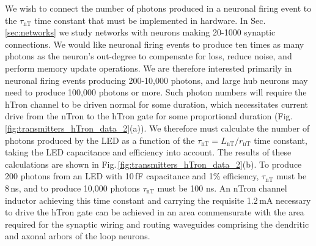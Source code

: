 \documentclass[twocolumn]{article}
\begin{document}
We wish to connect the number of photons produced in a neuronal firing event to the $\tau_{\mathrm{nT}}$ time constant that must be implemented in hardware. In Sec.\,\ref{sec:networks} we study networks with neurons making 20-1000 synaptic connections. We would like neuronal firing events to produce ten times as many photons as the neuron's out-degree to compensate for loss, reduce noise, and perform memory update operations. We are therefore interested primarily in neuronal firing events producing 200-10,000 photons, and large hub neurons may need to produce 100,000 photons or more. Such photon numbers will require the hTron channel to be driven normal for some duration, which necessitates current drive from the nTron to the hTron gate for some proportional duration (Fig.\,\ref{fig:transmitters_hTron_data_2}(a)). We therefore must calculate the number of photons produced by the LED as a function of the $\tau_{\mathrm{nT}} = L_{\mathrm{nT}}/r_{\mathrm{nT}}$ time constant, taking the LED capacitance and efficiency into account. The results of these calculations are shown in Fig.\,\ref{fig:transmitters_hTron_data_2}(b). To produce 200 photons from an LED with 10\,fF capacitance and 1\% efficiency, $\tau_{\mathrm{nT}}$ must be 8\,ns, and to produce 10,000 photons $\tau_{\mathrm{nT}}$ must be 100 ns. An nTron channel inductor achieving this time constant and carrying the requisite 1.2\,mA necessary to drive the hTron gate can be achieved in an area commensurate with the area required for the synaptic wiring and routing waveguides comprising the dendritic and axonal arbors of the loop neurons. 
\end{document}
